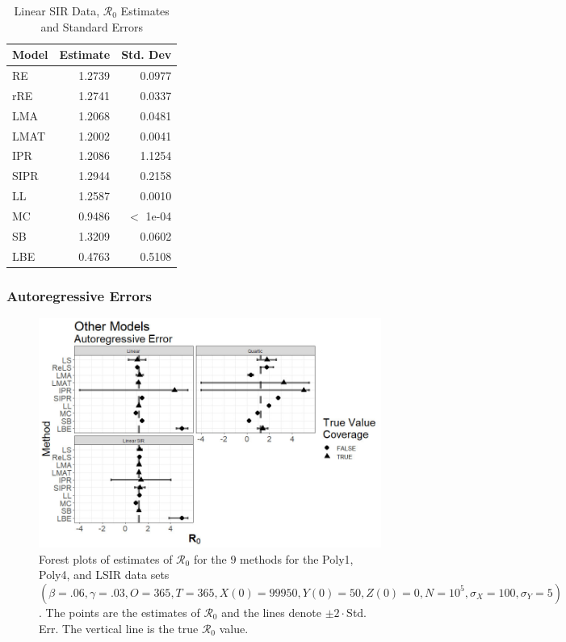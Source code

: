 \documentclass[12pt]{article}
\newcommand{\xxsir}{\ensuremath{9} } %
\newcommand{\rr}{\ensuremath{\mathcal{R}_0}}
\begin{document}
\begin{table}[H]
	
	\centering
	\begin{tabular}[t]{l|r|r}
		\hline
		Model & Estimate & Std. Dev\\
		\hline
		RE & 1.2739 & 0.0977\\
		\hline
		rRE & 1.2741 & 0.0337\\
		\hline
		LMA & 1.2068 & 0.0481\\
		\hline
		LMAT & 1.2002 & 0.0041\\
		\hline
		IPR & 1.2086 & 1.1254\\
		\hline
		SIPR & 1.2944 & 0.2158\\
		\hline
		LL & 1.2587 & 0.0010\\
		\hline
		MC & 0.9486 & $<$ 1e-04\\
		\hline
		SB & 1.3209 & 0.0602\\
		\hline
		LBE & 0.4763 & 0.5108\\
		\hline
	\end{tabular}
	\caption{Linear SIR Data, $\rr$ Estimates and Standard Errors}
\end{table}



\subsubsection{Autoregressive Errors}

\begin{figure}[H]
	\begin{center}
		\includegraphics[scale=0.5]{images/other_ar.jpg}
		\caption{Forest plots of estimates of $\rr$ for the \xxsir methods for the Poly1, Poly4, and LSIR data sets $(\beta=.06, \gamma=.03, O=365, T=365, X(0)=99950, Y(0)=50, Z(0)=0, N=10^5, \sigma_X=100, \sigma_Y=5)$.  The points are the estimates of $\rr$ and the lines denote $\pm 2\cdot $Std. Err.  The vertical line is the true $\rr$ value.}
	\end{center}
\end{figure}
\end{document}
